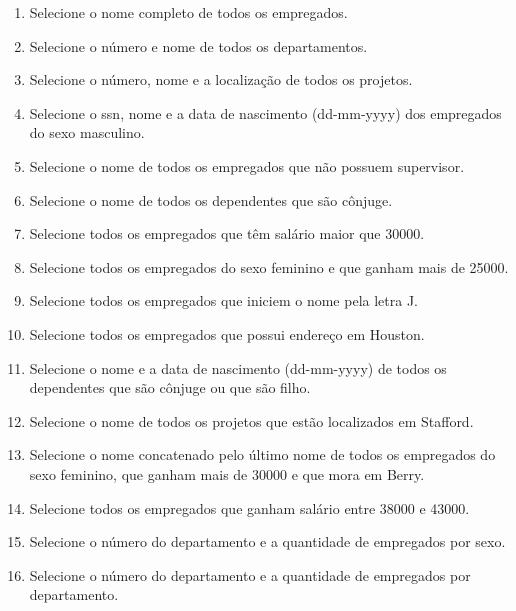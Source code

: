 \documentclass[11pt]{article}
\begin{document}
	\begin{enumerate}
		\item Selecione o nome completo de todos os empregados.
		
		\item Selecione o número e nome de todos os departamentos.
		
		\item Selecione o número, nome e a localização de todos os projetos.
				
		\item Selecione o ssn, nome e a data de nascimento (dd-mm-yyyy) dos empregados do sexo masculino.
		
		\item Selecione o nome de todos os empregados que não possuem supervisor.
		
		\item Selecione o nome de todos os dependentes que são cônjuge.
		
		\item Selecione todos os empregados que têm salário maior que 30000.
		
		\item Selecione todos os empregados do sexo feminino e que ganham mais de 25000.
		
		\item Selecione todos os empregados que iniciem o nome pela letra J.

		\item Selecione todos os empregados que possui endereço em Houston.
				
		\item Selecione o nome e a data de nascimento (dd-mm-yyyy) de todos os dependentes que são cônjuge ou que são filho.
		
		\item Selecione o nome de todos os projetos que estão localizados em Stafford.
		
		\item Selecione o nome concatenado pelo último nome de todos os empregados do sexo feminino, que ganham mais de 30000 e que mora em Berry.
		
		\item Selecione todos os empregados que ganham salário entre 38000 e 43000.
		
		\item Selecione o número do departamento e a quantidade de empregados por sexo.
		
		\item Selecione o número do departamento e a quantidade de empregados por departamento.
		

\end{enumerate}
\end{document}
